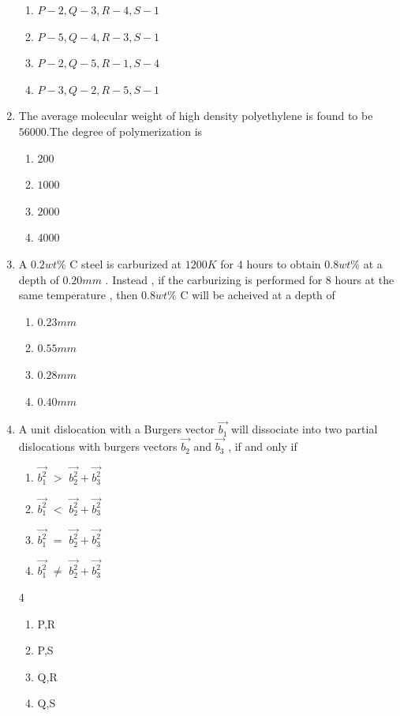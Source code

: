 \documentclass[journal]{IEEEtran}
\theoremstyle{remark}
\begin{document}
\begin{enumerate}
\begin{multicols}{2}
\begin{enumerate}
\item $P-2,Q-3,R-4,S-1$
\item $P-5,Q-4,R-3,S-1$
\item $P-2,Q-5,R-1,S-4$
\item $P-3,Q-2,R-5,S-1$
\end{enumerate}
\end{multicols}

\item  The average molecular weight of high density polyethylene is found to be $56000$.The degree of polymerization is \hfill{}
\begin{multicols}{4}
\begin{enumerate}
\item $200$
\item $1000$
\item $2000$
\item $4000$
\end{enumerate}
\end{multicols}

\item A $0.2wt\%$ C steel is carburized at $1200K$ for $4$ hours to obtain $0.8wt\%$ at a depth of $0.20mm$ . Instead , if the carburizing is performed for $8$ hours at the same temperature , then $0.8wt\%$ C will be acheived at a depth of
\hfill{}
\begin{multicols}{4}
\begin{enumerate}
\item $0.23mm$
\item $0.55mm$
\item $0.28mm$
\item $0.40mm$
\end{enumerate}
\end{multicols}

\item  A unit dislocation with a Burgers vector $\vec{b_1}$ will dissociate into two partial dislocations with burgers vectors $\vec{b_2}$ and $\vec{b_3}$ , if and only if  \hfill{}
\begin{enumerate}[label=\Alph*),start=16] 
    \item  $\vec{b_1^2}$ $>$ $\vec{b_2^2} + \vec{b_3^2}$
    \item  $\vec{b_1^2}$ $<$ $\vec{b_2^2} + \vec{b_3^2}$
    \item  $\vec{b_1^2}$ $=$ $\vec{b_2^2} + \vec{b_3^2}$
    \item  $\vec{b_1^2}$ $\neq$ $\vec{b_2^2} + \vec{b_3^2}$
\end{enumerate}
\begin {multicols}{4}
\begin{enumerate}
\item P,R
\item P,S
\item Q,R
\item Q,S
\end{enumerate}
\end{multicols}


\end{enumerate}
\end{document}
